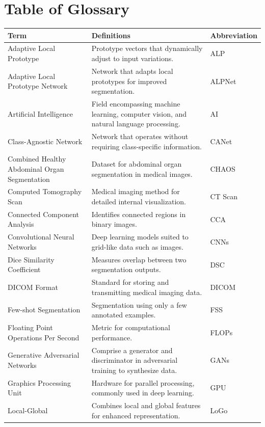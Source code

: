 \chapter*{Table of Glossary}

\begin{longtable}{|p{3cm}|p{8cm}|p{3cm}|} 
\hline
\textbf{Term} & \textbf{Definitions} & \textbf{Abbreviation} \\
\hline
Adaptive Local Prototype & Prototype vectors that dynamically adjust to input variations. & ALP \\ 
\hline
Adaptive Local Prototype Network & Network that adapts local prototypes for improved segmentation. & ALPNet \\ 
\hline
Artificial Intelligence & Field encompassing machine learning, computer vision, and natural language processing. & AI \\
\hline
Class-Agnostic Network & Network that operates without requiring class-specific information. & CANet \\
\hline
Combined Healthy Abdominal Organ Segmentation & Dataset for abdominal organ segmentation in medical images. & CHAOS \\ 
\hline
Computed Tomography Scan & Medical imaging method for detailed internal visualization. & CT Scan \\
\hline
Connected Component Analysis & Identifies connected regions in binary images. & CCA \\ 
\hline
Convolutional Neural Networks & Deep learning models suited to grid-like data such as images. & CNNs \\
\hline
Dice Similarity Coefficient & Measures overlap between two segmentation outputs. & DSC \\ 
\hline
DICOM Format & Standard for storing and transmitting medical imaging data. & DICOM \\ 
\hline
Few-shot Segmentation & Segmentation using only a few annotated examples. & FSS \\ 
\hline
Floating Point Operations Per Second & Metric for computational performance. & FLOPs \\ 
\hline
Generative Adversarial Networks & Comprise a generator and discriminator in adversarial training to synthesize data. & GANs \\ 
\hline
Graphics Processing Unit & Hardware for parallel processing, commonly used in deep learning. & GPU \\ 
\hline
Local-Global & Combines local and global features for enhanced representation. & LoGo \\

\end{longtable}

